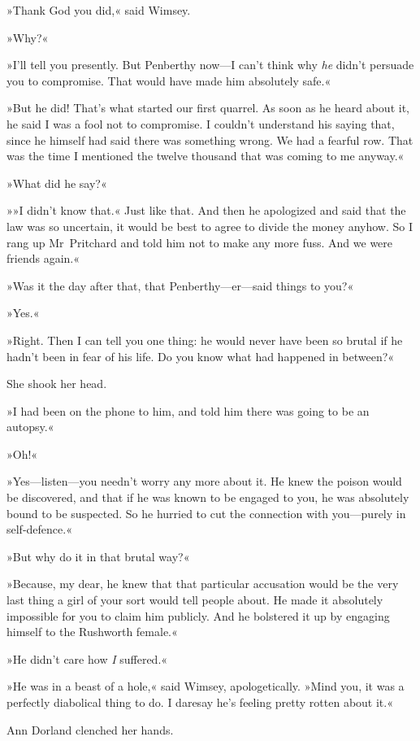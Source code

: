 »Thank God you did,« said Wimsey.

»Why?«

»I'll tell you presently. But Penberthy now—I can't think why \textit{he} didn't persuade you to compromise. That would have made him absolutely safe.«

»But he did! That's what started our first quarrel. As soon as he heard about it, he said I was a fool not to compromise. I couldn't understand his saying that, since he himself had said there was something wrong. We had a fearful row. That was the time I mentioned the twelve thousand that was coming to me anyway.«

»What did he say?«

»»I didn't know that.« Just like that. And then he apologized and said that the law was so uncertain, it would be best to agree to divide the money anyhow. So I rang up Mr~Pritchard and told him not to make any more fuss. And we were friends again.«

»Was it the day after that, that Penberthy—er—said things to you?«

»Yes.«

»Right. Then I can tell you one thing: he would never have been so brutal if he hadn't been in fear of his life. Do you know what had happened in between?«

She shook her head.

»I had been on the phone to him, and told him there was going to be an autopsy.«

»Oh!«

»Yes—listen—you needn't worry any more about it. He knew the poison would be discovered, and that if he was known to be engaged to you, he was absolutely bound to be suspected. So he hurried to cut the connection with you—purely in self-defence.«

»But why do it in that brutal way?«

»Because, my dear, he knew that that particular accusation would be the very last thing a girl of your sort would tell people about. He made it absolutely impossible for you to claim him publicly. And he bolstered it up by engaging himself to the Rushworth female.«

»He didn't care how \textit{I} suffered.«

»He was in a beast of a hole,« said Wimsey, apologetically. »Mind you, it was a perfectly diabolical thing to do. I daresay he's feeling pretty rotten about it.«

Ann Dorland clenched her hands.

